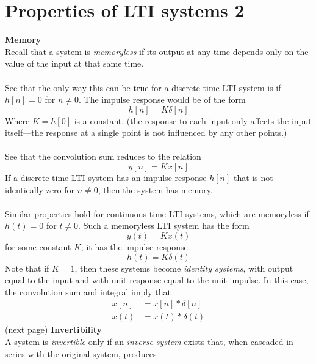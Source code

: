 \documentclass{report}
\begin{document}
\section{Properties of LTI systems 2}
\textbf{Memory}\\
Recall that a system is \textit{memoryless} if its output at any time depends only on the value of the input at that same time.\\
\vspace{1mm}\\
See that the only way this can be true for a discrete-time LTI system is if $h[n]=0$ for $n\neq0$. The impulse response would be
of the form
\begin{equation*}
h[n]=K\delta[n]
\end{equation*}
Where $K=h[0]$ is a constant. (the response to each input only affects the input itself---the response at a single point is not influenced by any other points.)\\
\vspace{1mm}\\
See that the convolution sum reduces to the relation
\begin{equation*}
y[n]=Kx[n]
\end{equation*}
If a discrete-time LTI system has an impulse response $h[n]$ that is not identically zero for $n\neq0$, then the system has memory.\\
\vspace{1mm}\\
Similar properties hold for continuous-time LTI systems, which are memoryless if $h(t)=0$ for $t\neq0$. Such a memoryless LTI system has
the form
\begin{equation*}
y(t)=Kx(t)
\end{equation*}
for some constant $K$; it has the impulse response
\begin{equation*}
h(t)=K\delta(t)
\end{equation*}
Note that if $K=1$, then these systems become \textit{identity systems}, with output equal to the input and with unit response 
equal to the unit impulse. In this case, the convolution sum and integral imply that
\begin{align*}
x[n]&=x[n]*\delta[n]\\
x(t)&=x(t)*\delta(t)
\end{align*}
(next page)\newpage
\noindent\textbf{Invertibility}\\
A system is \textit{invertible} only if an \textit{inverse system} exists that, when cascaded in series with the original system, produces
\end{document}
